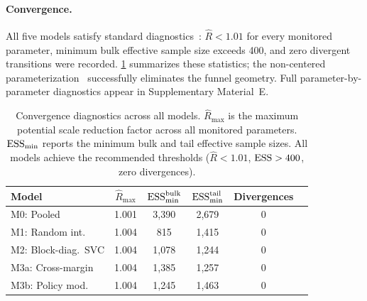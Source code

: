 \paragraph{Convergence.}
All five models satisfy standard diagnostics~\citep{Vehtari2021}:
$\hat{R} < 1.01$ for every monitored parameter, minimum bulk effective
sample size exceeds 400, and zero divergent transitions were recorded.
\cref{tab:convergence-summary} summarizes these statistics; the
non-centered parameterization~\citep{BetancourtGirolami2015} successfully
eliminates the funnel geometry. Full parameter-by-parameter diagnostics
appear in Supplementary Material~E.

\begin{table}[t]
\centering
\caption{Convergence diagnostics across all models. $\hat{R}_{\max}$ is the
  maximum potential scale reduction factor across all monitored parameters.
  $\text{ESS}_{\min}$ reports the minimum bulk and tail effective sample sizes.
  All models achieve the recommended thresholds ($\hat{R} < 1.01$,
  $\text{ESS} > 400$, zero divergences).}\label{tab:convergence-summary}
\smallskip
\begin{tabular}{@{}lccccc@{}}
\toprule
Model & $\hat{R}_{\max}$ & $\text{ESS}_{\min}^{\mathrm{bulk}}$
  & $\text{ESS}_{\min}^{\mathrm{tail}}$ & Divergences \\
\midrule
M0: Pooled         & 1.001 & 3{,}390 & 2{,}679 & 0 \\
M1: Random int.\   & 1.004 &    815  & 1{,}415 & 0 \\
M2: Block-diag.\ SVC & 1.004 & 1{,}078 & 1{,}244 & 0 \\
M3a: Cross-margin  & 1.004 & 1{,}385 & 1{,}257 & 0 \\
M3b: Policy mod.\  & 1.004 & 1{,}245 & 1{,}463 & 0 \\
\bottomrule
\end{tabular}
\end{table}

